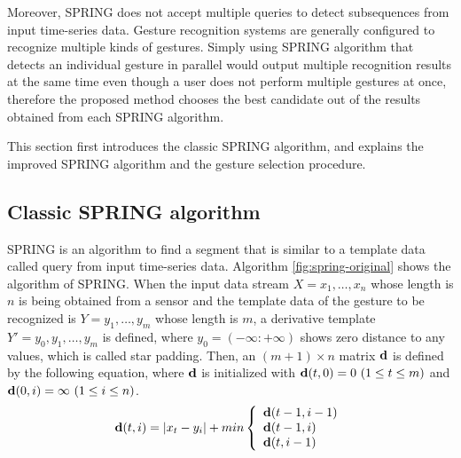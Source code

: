 \documentclass{sigchi-ext}
\begin{document}
        Moreover, SPRING does not accept multiple queries to detect subsequences from input time-series data. Gesture recognition systems are generally configured to recognize multiple kinds of gestures. Simply using SPRING algorithm that detects an individual gesture in parallel would output multiple recognition results at the same time even though a user does not perform multiple gestures at once, therefore the proposed method chooses the best candidate out of the results obtained from each SPRING algorithm.
        
        This section first introduces the classic SPRING algorithm, and explains the improved SPRING algorithm and the gesture selection procedure.

        \subsection{Classic SPRING algorithm}
        \label{sec:spring}

        SPRING is an algorithm to find a segment that is similar to a template data called query from input time-series data. Algorithm \ref{fig:spring-original} shows the algorithm of SPRING. When the input data stream $X=x_{1}, \dots, x_{n}$ whose length is $n$ is being obtained from a sensor and the template data of the gesture to be recognized is $Y=y_{1}, \dots, y_{m}$ whose length is $m$, a derivative template $Y'=y_0, y_1, \dots, y_m$ is defined, where $y_0=(-\infty:+\infty)$ shows zero distance to any values, which is called star padding. Then, an $(m+1)\times n$ matrix ${\bf d}$ is defined by the following equation, where ${\bf d}$ is initialized with ${\bf d}(t,0)=0~(1\leq t\leq m)$ and ${\bf d}(0,i)=\infty~(1\leq i\leq n)$.
        \begin{eqnarray}
            \label{eq:dist-wt}
            {\bf d}(t,i)=| x_{t} - y_{i} |+min\left\{\begin{array}{ll}
            {\bf d}(t-1,i-1) \\
            {\bf d}(t-1,i)\\
            {\bf d}(t,i-1)
            \end{array} \right.
        \end{eqnarray}
           
\end{document}
